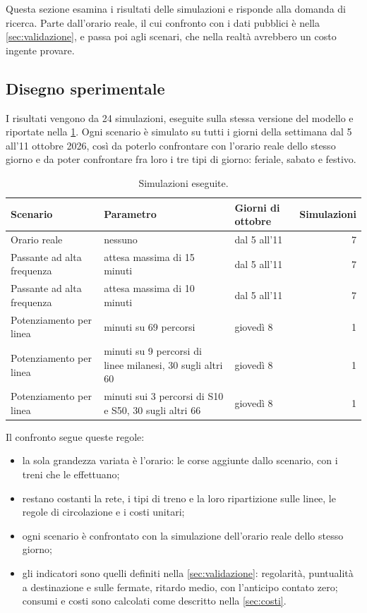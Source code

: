 Questa sezione esamina i risultati delle simulazioni e risponde alla domanda di ricerca. Parte dall'orario reale, il cui confronto con i dati pubblici è nella \cref{sec:validazione}, e passa poi agli scenari, che nella realtà avrebbero un costo ingente provare.

\subsection{Disegno sperimentale}
\label{sec:disegno-sperimentale}
I risultati vengono da 24 simulazioni, eseguite sulla stessa versione del modello e riportate nella \cref{tab:risultati-simulazioni}. Ogni scenario è simulato su tutti i giorni della settimana dal 5 all'11 ottobre 2026, così da poterlo confrontare con l'orario reale dello stesso giorno e da poter confrontare fra loro i tre tipi di giorno: feriale, sabato e festivo.

\begin{table}[H]
	\centering
	\caption{Simulazioni eseguite.}
	\label{tab:risultati-simulazioni}
	\begin{tabularx}{\textwidth}{l>{\raggedright\arraybackslash}Xlr}
		\toprule
		Scenario & Parametro & Giorni di ottobre & Simulazioni \\
		\midrule
		Orario reale & nessuno & dal 5 all'11 & 7 \\
		Passante ad alta frequenza & attesa massima di 15 minuti & dal 5 all'11 & 7 \\
		Passante ad alta frequenza & attesa massima di 10 minuti & dal 5 all'11 & 7 \\
		Potenziamento per linea & 30 minuti su 69 percorsi & giovedì 8 & 1 \\
		Potenziamento per linea & 15 minuti su 9 percorsi di linee milanesi, 30 sugli altri 60 & giovedì 8 & 1 \\
		Potenziamento per linea & 15 minuti sui 3 percorsi di S10 e S50, 30 sugli altri 66 & giovedì 8 & 1 \\
		\bottomrule
	\end{tabularx}
\end{table}

Il confronto segue queste regole:
\begin{itemize}
	\item la sola grandezza variata è l'orario: le corse aggiunte dallo scenario, con i treni che le effettuano;
	\item restano costanti la rete, i tipi di treno e la loro ripartizione sulle linee, le regole di circolazione e i costi unitari;
	\item ogni scenario è confrontato con la simulazione dell'orario reale dello stesso giorno;
	\item gli indicatori sono quelli definiti nella \cref{sec:validazione}: regolarità, puntualità a destinazione e sulle fermate, ritardo medio, con l'anticipo contato zero; consumi e costi sono calcolati come descritto nella \cref{sec:costi}.
\end{itemize}


